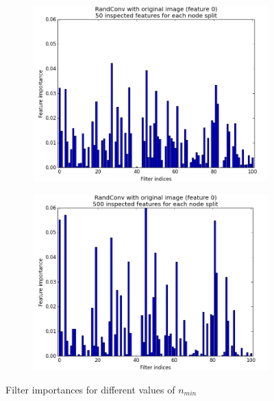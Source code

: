 \documentclass[a4paper]{report}
\begin{document}
\begin{figure}
\begin{subfigure}{.5\textwidth}
			\includegraphics[width=1.\linewidth]{images/FInmin50.png}
			\caption{\label{fig:FInmin50}}
		\end{subfigure}%
		\begin{subfigure}{.5\textwidth}
			\centering
			\includegraphics[width=1.\linewidth]{images/FInmin500.png}
			\caption{\label{fig:FInmin500}}
		\end{subfigure}
		\caption{\label{fig:FIPnmin}Filter importances for different values of $n_{min}$}
	\end{figure}
	
\end{document}
